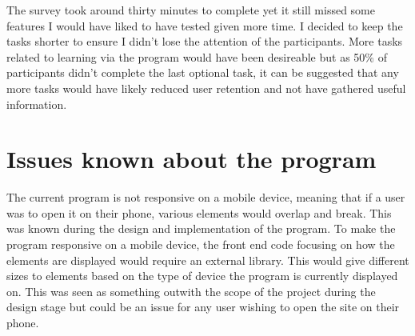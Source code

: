 \documentclass{l4proj}
\begin{document}
The survey took around thirty minutes to complete yet it still missed some features I would have liked to have tested given more time. I decided to keep the tasks shorter to ensure I didn't lose the attention of the participants. More tasks related to learning via the program would have been desireable but as 50\% of participants didn't complete the last optional task, it can be suggested that any more tasks would have likely reduced user retention and not have gathered useful information.

\section{Issues known about the program}
\label{section:issues}
The current program is not responsive on a mobile device, meaning that if a user was to open it on their phone, various elements would overlap and break. This was known during the design and implementation of the program. To make the program responsive on a mobile device, the front end code focusing on how the elements are displayed would require an external library. This would give different sizes to elements based on the type of device the program is currently displayed on. This was seen as something outwith the scope of the project during the design stage but could be an issue for any user wishing to open the site on their phone.
\end{document}
